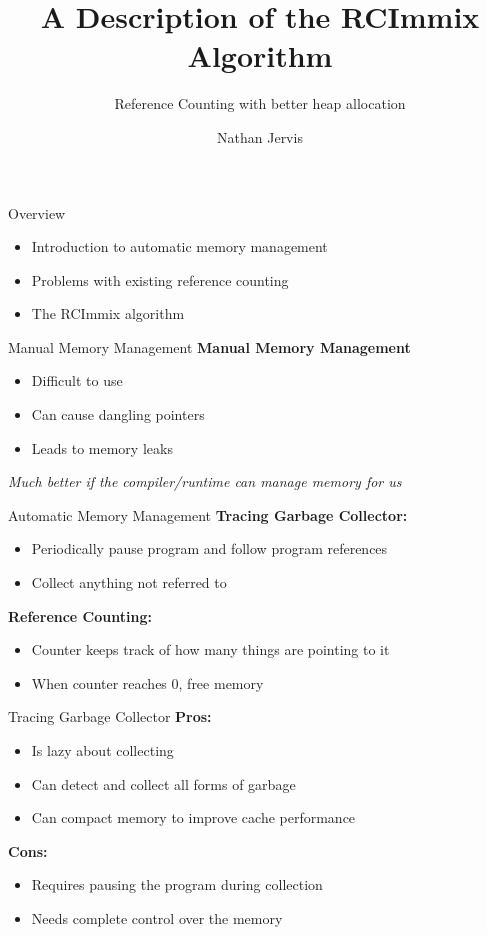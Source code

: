 \documentclass{beamer}
\title[RCImmix]{A Description of the RCImmix Algorithm}
\subtitle[RC]{Reference Counting with better heap allocation}
\author[N. Jervis]{Nathan Jervis}
\institute[McMaster]{
  Department of Computer Science\\
  McMaster University, Hamilton\\
  \texttt{jervisnd@mcmaster.ca}
}
\begin{document}
\begin{frame}[plain]
  \titlepage
\end{frame}

\begin{frame}{Overview}
	\begin{itemize}
		\item Introduction to automatic memory management
		\item Problems with existing reference counting
		\item The RCImmix algorithm
	\end{itemize}
\end{frame}

\begin{frame}{Manual Memory Management}
	\textbf{Manual Memory Management}
	\begin{itemize}
		\item Difficult to use
		\item Can cause dangling pointers
		\item Leads to memory leaks
	\end{itemize}
	\emph{Much better if the compiler/runtime can manage memory for us}
\end{frame}

\begin{frame}{Automatic Memory Management}
	\textbf{Tracing Garbage Collector:}
	\begin{itemize}
		\item Periodically pause program and follow program references
		\item Collect anything not referred to
	\end{itemize}
	\textbf{Reference Counting:}
	\begin{itemize}
		\item Counter keeps track of how many things are pointing to it
		\item When counter reaches 0, free memory
	\end{itemize}
\end{frame}

\begin{frame}{Tracing Garbage Collector}
	\textbf{Pros:}
	\begin{itemize}
		\item Is lazy about collecting
		\item Can detect and collect all forms of garbage
		\item Can compact memory to improve cache performance
	\end{itemize}
	\textbf{Cons:}
	\begin{itemize}
		\item Requires pausing the program during collection
		\item Needs complete control over the memory
	\end{itemize}
\end{frame}
\end{document}
